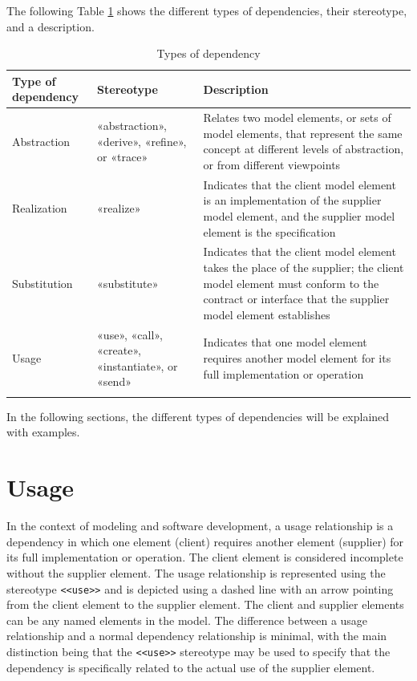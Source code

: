 \documentclass[
	12pt,
    a4paper,
    egregdoesnotlikesansseriftitles, %
    toc=chapterentrywithdots,
    oneside, openany,
    titlepage,
    parskip=half,
    headings=normal,  %
    listof=totoc,
    bibliography=totoc,
    index=totoc,
    captions=tableheading,  %
    listof=flat,
    numbers=noenddot, %
    final]
    {scrbook}
\begin{document}
The following Table \ref{tab:dependencies} shows the different types of dependencies, their stereotype, and a description.

\vspace{1em}
{\RaggedRight
\begin{longtable} {|p{3.5cm}|p{3.25cm}|p{6.5cm}|}
		\hline
		\textbf{Type of dependency} & \textbf{Stereotype} & \textbf{Description} \\
		\hline
		Abstraction & «abstraction», «derive», «refine», or «trace» & Relates two model elements, or sets of model elements, that represent the same concept at different levels of abstraction, or from different viewpoints  \\ 
		\hline
		Realization & «realize» & 	Indicates that the client model element is an implementation of the supplier model element, and the supplier model element is the specification \\ 
		\hline
		Substitution & «substitute» & Indicates that the client model element takes the place of the supplier; the client model element must conform to the contract or interface that the supplier model element establishes  \\ 
		\hline
		Usage & «use», «call», «create», «instantiate», or «send» & Indicates that one model element requires another model element for its full implementation or operation  \\ 
		\hline
	\caption[Types of dependencies]{Types of dependency \cite{ibm_dependencies} \cite{uml}}
	\label{tab:dependencies}
\end{longtable}
}

In the following sections, the different types of dependencies will be explained with examples.

\section{Usage}
In the context of modeling and software development, a usage relationship is a dependency in which one element (client) requires another element (supplier) for its full implementation or operation. 
The client element is considered incomplete without the supplier element. 
The usage relationship is represented using the stereotype \texttt{<<use>>} and is depicted using a dashed line with an arrow pointing from the client element to the supplier element. 
The client and supplier elements can be any named elements in the model. 
The difference between a usage relationship and a normal dependency relationship is minimal, with the main distinction being that the \texttt{<<use>>} stereotype may be used to specify that the dependency is specifically related to the actual use of the supplier element. \cite[p. 161]{uml}
\end{document}

